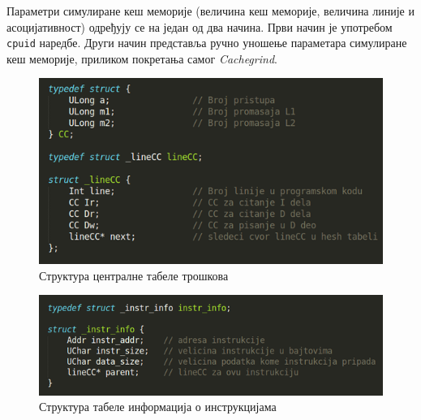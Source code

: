\documentclass[12pt,oneside]{memoir}
\begin{document}
\indent Параметри симулиране кеш меморије (величина кеш меморије, величина линије и асоцијативност) одређују се на један од два начина. Први начин је употребом \texttt{cpuid} наредбе. Други начин представља ручно уношење параметара симулиране кеш меморије, приликом покретања самог \textit{Cachegrind}.

\begin{figure}[h!]
\begin{center}
\includegraphics[scale=0.75]{slika11.png}
\end{center}
\caption{Структура централне табеле трошкова}
\label{fig:tabelaTroskova}
\end{figure}

\begin{figure}[h!]
\begin{center}
\includegraphics[scale=0.75]{slika12.png}
\end{center}
\caption{Структура табеле информација о инструкцијама} 
\label{fig:infoInstr}
\end{figure}
\end{document}
